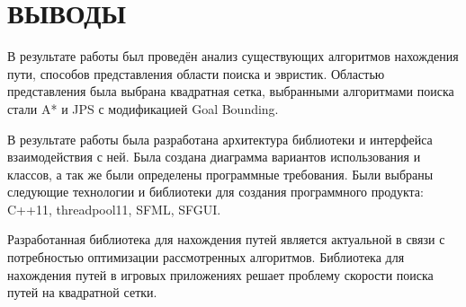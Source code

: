 \section*{ВЫВОДЫ}

\vspace{1\baselineskip} 


В результате работы был проведён анализ существующих алгоритмов нахождения пути, способов представления области поиска и эвристик. Областью представления была выбрана квадратная сетка, выбранными алгоритмами поиска стали A* и JPS с модификацией Goal Bounding.

В результате работы была разработана архитектура библиотеки и интерфейса взаимодействия с ней. Была создана диаграмма вариантов использования и классов, а так же были определены программные требования. Были выбраны следующие технологии и библиотеки для создания программного продукта: C++11, threadpool11, SFML, SFGUI.

Разработанная библиотека для нахождения путей является актуальной в связи с потребностью оптимизации рассмотренных алгоритмов. Библиотека для нахождения путей в игровых приложениях решает проблему скорости поиска путей на квадратной сетки.